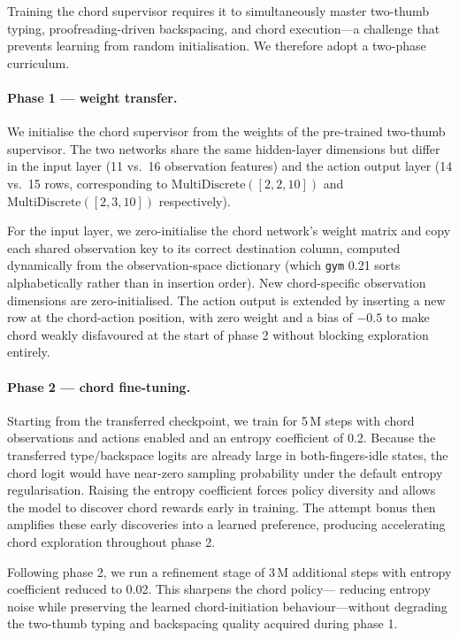 \documentclass[sigconf,review,anonymous]{acmart}
\begin{document}
Training the chord supervisor requires it to simultaneously master
two-thumb typing, proofreading-driven backspacing, and chord execution—a
challenge that prevents learning from random initialisation.  We therefore
adopt a two-phase curriculum.

\paragraph{Phase 1 — weight transfer.}
We initialise the chord supervisor from the weights of the pre-trained
two-thumb supervisor.  The two networks share the same hidden-layer
dimensions but differ in the input layer (11 vs.\ 16 observation features)
and the action output layer (14 vs.\ 15 rows, corresponding to
$\text{MultiDiscrete}([2,2,10])$ and $\text{MultiDiscrete}([2,3,10])$
respectively).

For the input layer, we zero-initialise the chord network's weight matrix
and copy each shared observation key to its correct destination column,
computed dynamically from the observation-space dictionary (which
\texttt{gym} 0.21 sorts alphabetically rather than in insertion order).
New chord-specific observation dimensions are zero-initialised.  The action
output is extended by inserting a new row at the chord-action position, with
zero weight and a bias of $-0.5$ to make chord weakly disfavoured at the
start of phase 2 without blocking exploration entirely.

\paragraph{Phase 2 — chord fine-tuning.}
Starting from the transferred checkpoint, we train for 5\,M steps with
chord observations and actions enabled and an entropy coefficient of 0.2.
Because the transferred type/backspace logits are already large in
both-fingers-idle states, the chord logit would have near-zero sampling
probability under the default entropy regularisation.  Raising the entropy
coefficient forces policy diversity and allows the model to discover chord
rewards early in training.  The attempt bonus then amplifies these early
discoveries into a learned preference, producing accelerating chord
exploration throughout phase 2.

Following phase 2, we run a refinement stage of 3\,M additional steps with
entropy coefficient reduced to 0.02.  This sharpens the chord policy—
reducing entropy noise while preserving the learned chord-initiation
behaviour—without degrading the two-thumb typing and backspacing quality
acquired during phase 1.
 
\end{document}
